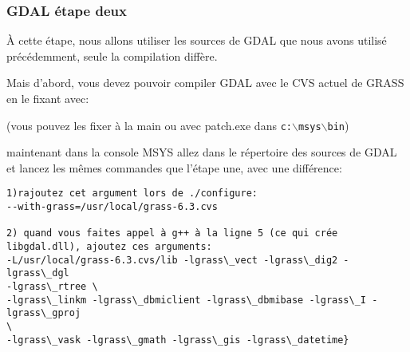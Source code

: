 % 
% 
% 

\subsubsection{GDAL étape deux}
À cette étape, nous allons utiliser les sources de GDAL que nous avons utilisé précédemment, seule la compilation diffère.

Mais d'abord, vous devez pouvoir compiler GDAL avec le CVS actuel de GRASS en le fixant avec:

 \begin{quotation}
 \end{quotation}
(vous pouvez les fixer à la main ou avec patch.exe dans \texttt{c:$\backslash$msys$\backslash$bin})

maintenant dans la console MSYS allez dans le répertoire des sources de GDAL et lancez les mêmes commandes que l'étape une, avec une différence:

\begin{verbatim}
1)rajoutez cet argument lors de ./configure:
--with-grass=/usr/local/grass-6.3.cvs

2) quand vous faites appel à g++ à la ligne 5 (ce qui crée libgdal.dll), ajoutez ces arguments: 
-L/usr/local/grass-6.3.cvs/lib -lgrass\_vect -lgrass\_dig2 -lgrass\_dgl
-lgrass\_rtree \
-lgrass\_linkm -lgrass\_dbmiclient -lgrass\_dbmibase -lgrass\_I -lgrass\_gproj
\ 
-lgrass\_vask -lgrass\_gmath -lgrass\_gis -lgrass\_datetime}
\end{verbatim}

